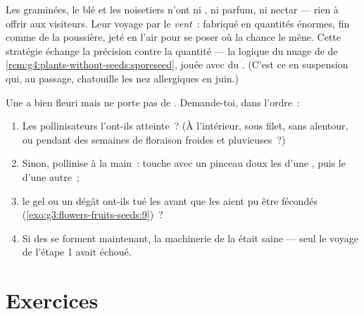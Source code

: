 \begin{example}\label{ex:g5:flower-to-fruit:wind}
Les graminées, le blé et les noisetiers n'ont ni , ni parfum,
ni nectar --- rien à offrir aux visiteurs. Leur  voyage par le
\emph{vent}~: fabriqué en quantités énormes, fin comme de la
poussière, jeté en l'air pour se poser où la chance le mène. Cette
stratégie échange la précision contre la quantité --- la logique du
nuage de  de
\cref{rem:g4:plants-without-seeds:sporeseed}, jouée avec du .
(C'est ce  en suspension qui, au passage, chatouille les nez
allergiques en juin.)
\end{example}

\begin{method}\label{met:g5:flower-to-fruit:diagnose}
Une  a bien fleuri mais ne porte pas de . Demande-toi,
dans l'ordre~:
\begin{enumerate}
  \item Les pollinisateurs l'ont-ils atteinte~? (À l'intérieur,
        sous filet, sans  alentour, ou pendant des semaines
        de floraison froides et pluvieuses~?)
  \item Sinon, pollinise à la main~: touche avec un pinceau doux
        les  d'une , puis le  d'une autre~;
  \item le gel ou un dégât ont-ils tué les  avant que les
         aient pu être fécondés
        (\cref{exo:g3:flowers-fruits-seeds:9})~?
  \item Si des  se forment maintenant, la machinerie de la
         était saine --- seul le voyage de l'étape 1 avait
        échoué.
\end{enumerate}
\end{method}

\section{Exercices}

